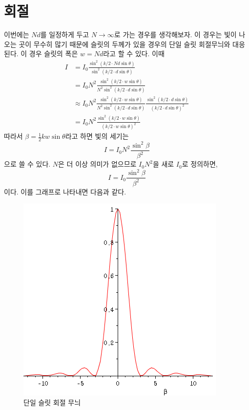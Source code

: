 \section{회절}
이번에는 $Nd$를 일정하게 두고 $N\to\infty$로 가는 경우를 생각해보자. 이 경우는 빛이 나오는 곳이 무수히 많기 때문에 슬릿의 두께가 있을 경우의 단일 슬릿 회절무늬와 대응된다. 이 경우 슬릿의 폭은 $w=Nd$라고 할 수 있다.
이때
\begin{align}
I&=I_0 \frac{\sin^2 (k/2\cdot Nd\sin\theta)}{\sin^2 (k/2\cdot d\sin\theta)}\\
&=I_0N^2 \frac{\sin^2 (k/2\cdot w\sin\theta)}{N^2\sin^2 (k/2\cdot d\sin\theta)}\\
&\approx I_0N^2 \frac{\sin^2 (k/2\cdot w\sin\theta)}{N^2\sin^2 (k/2\cdot d\sin\theta)} \frac{\sin^2 (k/2\cdot d\sin\theta)}{(k/2\cdot d\sin\theta)^2}\\
&= I_0N^2 \frac{\sin^2 (k/2\cdot w\sin\theta)}{(k/2\cdot w\sin\theta)^2}
\end{align}
따라서 $\beta = \frac{1}{2}kw\sin\theta$라고 하면 빛의 세기는 
\begin{equation}
I=I_0N^2 \frac{\sin^2 \beta}{\beta^2}
\end{equation}
으로 쓸 수 있다. $N$은 더 이상 의미가 없으므로 $I_0N^2$을 새로 $I_0$로 정의하면, 
\begin{equation}
I=I_0 \frac{\sin^2 \beta}{\beta^2}\label{eq:singlediff}
\end{equation}
이다. 이를 그래프로 나타내면 다음과 같다.
\begin{figure}[h]
\centering\includegraphics[scale=0.5]{Pictures/diffraction.PNG}
\caption{단일 슬릿 회절 무늬}
\label{fig:diffslit}
\end{figure}

